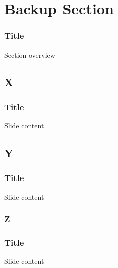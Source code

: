 % 

\section{Backup Section}
\begin{frame}\frametitle{Title}
\center
	Section overview
\end{frame}

\subsection{X}
\begin{frame}\frametitle{Title}
\center
	Slide content
\end{frame}

\subsection{Y}
\begin{frame}\frametitle{Title}
\center
	Slide content
\end{frame}

\subsubsection{Z}
\begin{frame}\frametitle{Title}
\center
	Slide content
\end{frame}

\endinput  %
